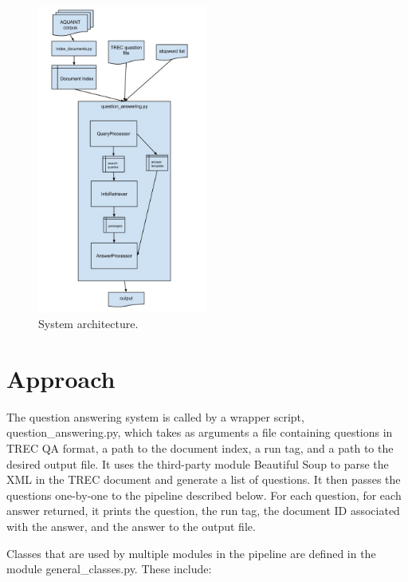 \documentclass[11pt]{article}
\begin{document}
\begin{figure}
  \centering
    \includegraphics[width=0.5\textwidth]{system_architecture.jpg}
 \caption{System architecture.}
\end{figure}

\section{Approach}

The question answering system is called by a wrapper script, question\_answering.py, which takes as arguments a file containing questions in TREC QA format, a path to the document index, a run tag, and a path to the desired output file. It uses the third-party module Beautiful Soup to parse the XML in the TREC document and generate a list of questions. It then passes the questions one-by-one to the pipeline described below. For each question, for each answer returned, it prints the question, the run tag, the document ID associated with the answer, and the answer to the output file.

Classes that are used by multiple modules in the pipeline are defined in the module general\_classes.py. These include:
\end{document}
